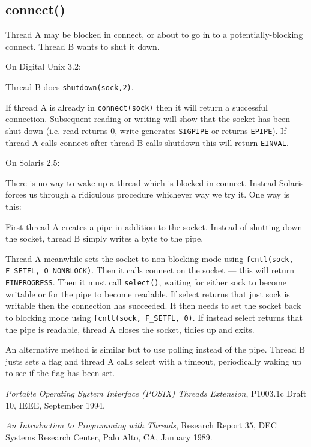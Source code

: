 \documentclass[11pt,twoside,a4paper]{article}
\begin{document}
\subsection{connect()}

Thread A may be blocked in connect, or about to go in to a
potentially-blocking connect.  Thread B wants to shut it down.


On Digital Unix 3.2:

Thread B does \verb|shutdown(sock,2)|.

If thread A is already in \verb|connect(sock)| then it will return a
successful connection.  Subsequent reading or writing will show that
the socket has been shut down (i.e. read returns 0, write generates
\verb|SIGPIPE| or returns \verb|EPIPE|).  If thread A calls connect
after thread B calls shutdown this will return \verb|EINVAL|.


On Solaris 2.5:

There is no way to wake up a thread which is blocked in connect.
Instead Solaris forces us through a ridiculous procedure whichever way
we try it.  One way is this:

First thread A creates a pipe in addition to the socket.  Instead of
shutting down the socket, thread B simply writes a byte to the pipe.

Thread A meanwhile sets the socket to non-blocking mode using
\verb|fcntl(sock,| \verb|F_SETFL, O_NONBLOCK)|.  Then it calls connect
on the socket --- this will return \verb|EINPROGRESS|.  Then it must
call \verb|select()|, waiting for either sock to become writable or
for the pipe to become readable.  If select returns that just sock is
writable then the connection has succeeded.  It then needs to set the
socket back to blocking mode using \verb|fcntl(sock, F_SETFL, 0)|.  If
instead select returns that the pipe is readable, thread A closes the
socket, tidies up and exits.

An alternative method is similar but to use polling instead of the
pipe.  Thread B justs sets a flag and thread A calls select with a
timeout, periodically waking up to see if the flag has been set.


\begin{thebibliography}{lo}

\emph{Portable Operating System Interface (POSIX) Threads Extension},
P1003.1c Draft 10,
IEEE,
September 1994.

\emph{An Introduction to Programming with Threads},
Research Report 35,
DEC Systems Research Center,
Palo Alto, CA,
January 1989.

\end{thebibliography}
\end{document}
